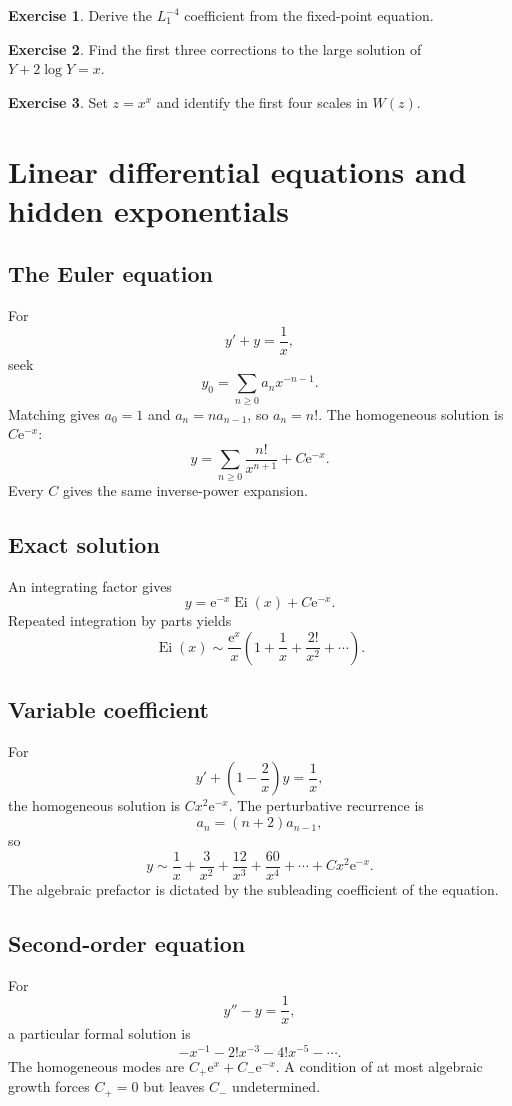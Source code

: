 \documentclass[11pt,oneside,openany]{book}
\newcommand{\Ei}{\operatorname{Ei}}
\newcommand{\e}{\mathrm{e}}
\theoremstyle{plain}
\theoremstyle{definition}
\newtheorem{exercise}{Exercise}[chapter]
\theoremstyle{remark}
\begin{document}
\begin{exercise}
Derive the $L_1^{-4}$ coefficient from the fixed-point equation.
\end{exercise}

\begin{exercise}
Find the first three corrections to the large solution of $Y+2\log Y=x$.
\end{exercise}

\begin{exercise}
Set $z=x^x$ and identify the first four scales in $W(z)$.
\end{exercise}


\chapter{Linear differential equations and hidden exponentials}
\label{ch:linear-odes}

\section{The Euler equation}
For
\[
  y'+y=\frac1x,
\]
seek
\[
  y_0=\sum_{n\ge0}a_nx^{-n-1}.
\]
Matching gives $a_0=1$ and $a_n=na_{n-1}$, so $a_n=n!$. The homogeneous solution is $C\e^{-x}$:
\[
  \boxed{
  y=\sum_{n\ge0}\frac{n!}{x^{n+1}}+C\e^{-x}.}
\]
Every $C$ gives the same inverse-power expansion.

\section{Exact solution}
An integrating factor gives
\[
  y=\e^{-x}\Ei(x)+C\e^{-x}.
\]
Repeated integration by parts yields
\[
  \Ei(x)\sim\frac{\e^x}{x}
  \left(1+\frac1x+\frac{2!}{x^2}+\cdots\right).
\]

\section{Variable coefficient}
For
\[
  y'+\left(1-\frac2x\right)y=\frac1x,
\]
the homogeneous solution is $Cx^2\e^{-x}$. The perturbative recurrence is
\[
  a_n=(n+2)a_{n-1},
\]
so
\[
  y\sim\frac1x+\frac3{x^2}+\frac{12}{x^3}
  +\frac{60}{x^4}+\cdots+Cx^2\e^{-x}.
\]
The algebraic prefactor is dictated by the subleading coefficient of the equation.

\section{Second-order equation}
For
\[
  y''-y=\frac1x,
\]
a particular formal solution is
\[
  -x^{-1}-2!x^{-3}-4!x^{-5}-\cdots.
\]
The homogeneous modes are $C_+\e^x+C_-\e^{-x}$. A condition of at most algebraic growth forces $C_+=0$ but leaves $C_-$ undetermined.
\end{document}
